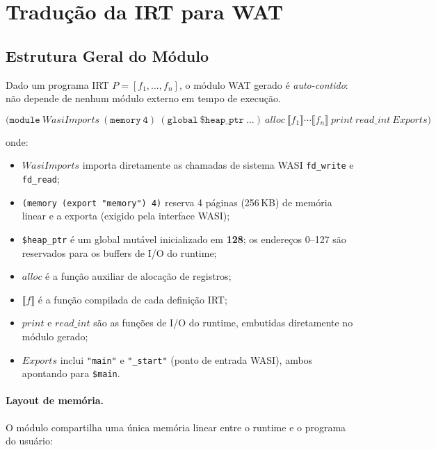 \section{Tradução da IRT para WAT}\label{sec:irt-to-wat}

\subsection{Estrutura Geral do Módulo}

Dado um programa IRT $P = [f_1, \ldots, f_n]$, o módulo WAT gerado é
\emph{auto-contido}: não depende de nenhum módulo externo em tempo de execução.

\[
  \mathtt{(module}\ \mathit{WasiImports}\ \mathtt{(memory\ 4)}\ \mathtt{(global\ \$heap\_ptr\ \ldots)}\ \mathit{alloc}\ \llbracket
    f_1 \rrbracket \cdots \llbracket f_n
  \rrbracket\ \mathit{print}\ \mathit{read\_int}\ \mathit{Exports}\mathtt{)}
\]

onde:
\begin{itemize}
  \item $\mathit{WasiImports}$ importa diretamente as chamadas de sistema WASI
    \texttt{fd\_write} e \texttt{fd\_read};
  \item \texttt{(memory (export "memory") 4)} reserva 4 páginas (256\,KB) de
    memória linear e a exporta (exigido pela interface WASI);
  \item \texttt{\$heap\_ptr} é um global mutável inicializado em \textbf{128};
    os endereços 0–127 são reservados para os buffers de I/O do runtime;
  \item $\mathit{alloc}$ é a função auxiliar de alocação de registros;
  \item $\llbracket f \rrbracket$ é a função compilada de cada definição IRT;
  \item $\mathit{print}$ e $\mathit{read\_int}$ são as funções de I/O do
    runtime, embutidas diretamente no módulo gerado;
  \item $\mathit{Exports}$ inclui \texttt{"main"} e \texttt{"\_start"} (ponto
    de entrada WASI), ambos apontando para \texttt{\$main}.
\end{itemize}

\paragraph{Layout de memória.} O módulo compartilha uma única memória linear
entre o runtime e o programa do usuário:

